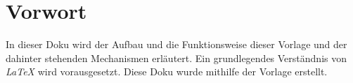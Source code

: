 \documentclass[12pt]{article}
\begin{document}
\renewcommand{\mytitle}{Dokumentation/Tutorial}%
\renewcommand{\myauthor}{Dr. Frank N. Furter}%



\frontmatter%


\printabbreviations%
\clearpage
\renewcommand{\plaintitle}{Abbildungsverzeichnis}
{\def\makebox[#1][#2]#3{#3}%
\listoffigures
}
\clearpage
\renewcommand{\plaintitle}{Tabellenverzeichnis}
{\def\makebox[#1][#2]#3{#3}%
\listoftables
}
\clearpage
\renewcommand{\plaintitle}{Inhaltsverzeichnis}%
{\def\makebox[#1][#2]#3{#3}%
	\tableofcontents
}


\clearpage
\mainmatter%

\part{Vorwort}
In dieser Doku wird der Aufbau und die Funktionsweise dieser Vorlage und der dahinter stehenden Mechanismen erläutert. Ein grundlegendes Verständnis von \textit{LaTeX} wird vorausgesetzt. Diese Doku wurde mithilfe der Vorlage erstellt.
\end{document}
